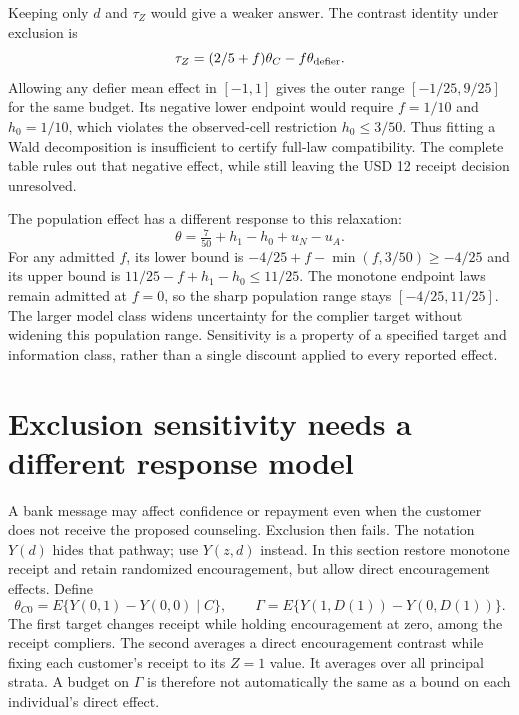 Keeping only $d$ and $\tau_Z$ would give a weaker answer. The contrast
identity under exclusion is
\[
 \tau_Z=(2/5+f)\theta_C-f\theta_{\rm defier}.
\]
Allowing any defier mean effect in $[-1,1]$ gives the outer range
$[-1/25,9/25]$ for the same budget. Its negative lower endpoint
would require $f=1/10$ and $h_0=1/10$, which violates the
observed-cell restriction $h_0\leq3/50$.
Thus fitting a Wald decomposition is insufficient to certify full-law
compatibility. The complete table rules out that negative effect, while
still leaving the USD 12 receipt decision unresolved.

The population effect has a different response to this relaxation:
\[
 \theta=\tfrac7{50}+h_1-h_0+u_N-u_A.
\]
For any admitted $f$, its lower bound is
$-4/25+f-\min(f,3/50)\geq-4/25$ and its upper bound is
$11/25-f+h_1-h_0\leq11/25$.
The monotone endpoint laws remain admitted at $f=0$, so the sharp
population range stays $[-4/25,11/25]$. The larger model class
widens uncertainty for the complier target without widening this
population range. Sensitivity is a property of a specified target and
information class, rather than a single discount applied to every
reported effect.\citep{exec17_s3_sensitivity}

\section{Exclusion sensitivity needs a different response model}
\label{exec17:s3-exclusion}

A bank message may affect confidence or repayment even when the customer
does not receive the proposed counseling. Exclusion then fails.
The notation $Y(d)$ hides that pathway; use $Y(z,d)$ instead.
In this section restore monotone receipt and retain randomized encouragement,
but allow direct encouragement effects. Define
\[
 \theta_{C0}=E\{Y(0,1)-Y(0,0)\mid C\},\qquad
 \Gamma=E\{Y(1,D(1))-Y(0,D(1))\}.
\]
The first target changes receipt while holding encouragement at zero,
among the receipt compliers. The second averages a direct encouragement
contrast while fixing each customer's receipt to its $Z=1$ value.
It averages over all principal strata. A budget on $\Gamma$ is therefore
not automatically the same as a bound on each individual's direct effect.

